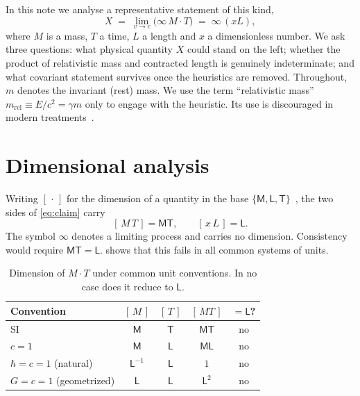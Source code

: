 \documentclass[11pt,a4paper]{article}
\theoremstyle{definition}
\theoremstyle{remark}
\newcommand{\mrel}{m_{\mathrm{rel}}}
\newcommand{\dimof}[1]{\left[\,#1\,\right]}
\newcommand{\sfM}{\mathsf{M}}
\newcommand{\sfL}{\mathsf{L}}
\newcommand{\sfT}{\mathsf{T}}
\begin{document}
In this note we analyse a representative statement of this kind,
\begin{equation}
  X \;=\; \lim_{v\to c}\bigl(\infty\,M\cdot T\bigr) \;=\; \infty\,(xL),
  \label{eq:claim}
\end{equation}
where $M$ is a mass, $T$ a time, $L$ a length and $x$ a dimensionless number.
We ask three questions: what physical quantity $X$ could stand on the left;
whether the product of relativistic mass and contracted length is genuinely
indeterminate; and what covariant statement survives once the heuristics are
removed. Throughout, $m$ denotes the invariant (rest) mass. We use the term
``relativistic mass'' $\mrel\equiv E/c^2=\gamma m$ only to engage with the
heuristic. Its use is discouraged in modern
treatments~\cite{Okun1989,TaylorWheeler}.

\section{Dimensional analysis}\label{sec:dims}

Writing $\dimof{\cdot}$ for the dimension of a quantity in the base
$\{\sfM,\sfL,\sfT\}$~\cite{Bridgman}, the two sides of \cref{eq:claim} carry
\begin{equation}
  \dimof{M\,T}=\sfM\sfT,\qquad \dimof{x\,L}=\sfL.
  \label{eq:dims}
\end{equation}
The symbol $\infty$ denotes a limiting process and carries no dimension.
Consistency would require $\sfM\sfT=\sfL$.  shows that this
fails in all common systems of units.

\begin{table}[h]
  \centering
  \caption{Dimension of $M\cdot T$ under common unit conventions. In no case
  does it reduce to $\sfL$.}
  \label{tab:units}
  \begin{tabular}{@{}lcccc@{}}
    \toprule
    Convention & $\dimof{M}$ & $\dimof{T}$ & $\dimof{MT}$ & $=\sfL$? \\
    \midrule
    SI                         & $\sfM$       & $\sfT$ & $\sfM\sfT$ & no \\
    $c=1$                      & $\sfM$       & $\sfL$ & $\sfM\sfL$ & no \\
    $\hbar=c=1$ (natural)      & $\sfL^{-1}$  & $\sfL$ & $1$        & no \\
    $G=c=1$ (geometrized)      & $\sfL$       & $\sfL$ & $\sfL^{2}$ & no \\
    \bottomrule
  \end{tabular}
\end{table}
\end{document}

